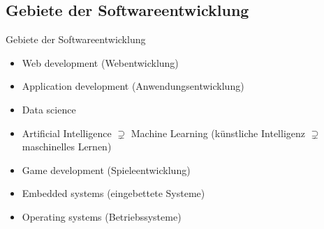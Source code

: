 \subsection{Gebiete der Softwareentwicklung}

\newSectionPage{\insertsubsectionhead}

\begin{frame}{Gebiete der Softwareentwicklung}
    \begin{itemize}
        \item Web development (Webentwicklung)
        \item Application development (Anwendungsentwicklung)
        \item Data science
        \item Artificial Intelligence $\supsetneq$ Machine Learning
              (künstliche Intelligenz $\supsetneq$ maschinelles Lernen)
        \item Game development (Spieleentwicklung)
        \item Embedded systems (eingebettete Systeme)
        \item Operating systems (Betriebssysteme)
    \end{itemize}

\end{frame}

